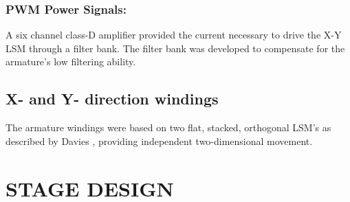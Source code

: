 \documentclass[10pt,twocolumn]{witseiepaper}
\begin{document}
\subsubsection*{PWM Power Signals:}
A six channel class-D amplifier provided the current necessary to drive the
X-Y LSM through a filter bank. The filter bank was developed to compensate for
the armature's low filtering ability.

\subsection{X- and Y- direction windings}

The armature windings were based on two flat, stacked, orthogonal LSM's as
described by Davies \cite{Simon}, providing independent two-dimensional
movement.

\section{STAGE DESIGN}
\end{document}
